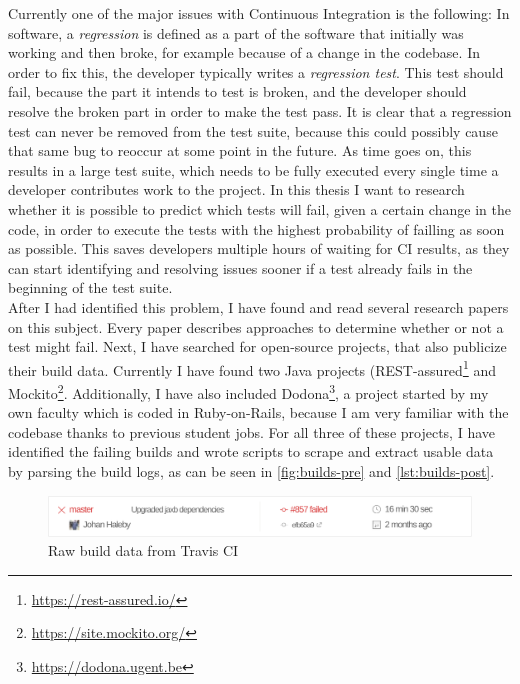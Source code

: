 \noindent Currently one of the major issues with Continuous Integration is the following: In software, a \emph{regression} is defined as a part of the software that initially was working and then broke, for example because of a change in the codebase. In order to fix this, the developer typically writes a \emph{regression test}. This test should fail, because the part it intends to test is broken, and the developer should resolve the broken part in order to make the test pass. It is clear that a regression test can never be removed from the test suite, because this could possibly cause that same bug to reoccur at some point in the future. As time goes on, this results in a large test suite, which needs to be fully executed every single time a developer contributes work to the project. In this thesis I want to research whether it is possible to predict which tests will fail, given a certain change in the code, in order to execute the tests with the highest probability of failling as soon as possible. This saves developers multiple hours of waiting for CI results, as they can start identifying and resolving issues sooner if a test already fails in the beginning of the test suite.\\

\noindent After I had identified this problem, I have found and read several research papers on this subject. Every paper describes approaches to determine whether or not a test might fail. Next, I have searched for open-source projects, that also publicize their build data. Currently I have found two Java projects (REST-assured\footnote{\url{https://rest-assured.io/}} and Mockito\footnote{\url{https://site.mockito.org/}}. Additionally, I have also included Dodona\footnote{\url{https://dodona.ugent.be}}, a project started by my own faculty which is coded in Ruby-on-Rails, because I am very familiar with the codebase thanks to previous student jobs. For all three of these projects, I have identified the failing builds and wrote scripts to scrape and extract usable data by parsing the build logs, as can be seen in \autoref{fig:builds-pre} and \autoref{lst:builds-post}.

\begin{figure}[htbp]
  \includegraphics[width=\textwidth]{assets/builds-pre.pdf}
  \caption{Raw build data from Travis CI}
  \label{fig:builds-pre}
\end{figure}

